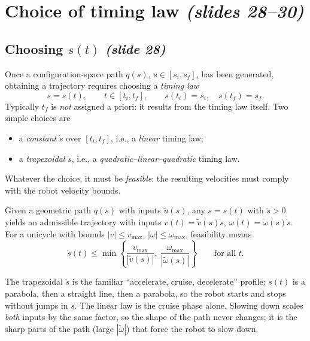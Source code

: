 \documentclass[11pt,a4paper]{article}
\def\boldsymbol#1{#1}%
\newcommand{\q}{\boldsymbol{q}}
\newcommand{\ut}{\tilde{\boldsymbol{u}}}
\newcommand{\vt}{\tilde v}
\newcommand{\wt}{\tilde\omega}
\theoremstyle{definition}
\theoremstyle{plain}
\theoremstyle{remark}
\begin{document}
\section{Choice of timing law \emph{(slides 28--30)}}
 
\subsection{Choosing $s(t)$ \emph{(slide 28)}}
 
Once a configuration-space path $\q(s)$, $s\in[s_i,s_f]$, has been generated, obtaining a trajectory requires choosing a
\emph{timing law}
\begin{equation}
s=s(t),\qquad t\in[t_i,t_f],\qquad s(t_i)=s_i,\quad s(t_f)=s_f .
\end{equation}
Typically $t_f$ is \emph{not} assigned a priori: it results from the timing law itself. Two simple choices are
\begin{itemize}[nosep]
\item a \emph{constant} $\dot s$ over $[t_i,t_f]$, i.e., a \emph{linear} timing law;
\item a \emph{trapezoidal} $\dot s$, i.e., a \emph{quadratic--linear--quadratic} timing law.
\end{itemize}
Whatever the choice, it must be \emph{feasible}: the resulting velocities must comply with the robot velocity bounds.
 
Given a geometric path $\q(s)$ with inputs $\ut(s)$, any $s=s(t)$ with $\dot s>0$ yields an admissible trajectory with inputs
$v(t)=\vt(s)\dot s$, $\omega(t)=\wt(s)\dot s$. For a unicycle with bounds $|v|\le v_{\max}$, $|\omega|\le\omega_{\max}$, feasibility means
\[
\dot s(t)\le\min\left\{\frac{v_{\max}}{|\vt(s)|},\ \frac{\omega_{\max}}{|\wt(s)|}\right\}\qquad\text{for all } t .
\]
 
\begin{intuition}
The trapezoidal $\dot s$ is the familiar ``accelerate, cruise, decelerate'' profile: $s(t)$ is a parabola, then a straight line, then a
parabola, so the robot starts and stops without jumps in $\dot s$. The linear law is the cruise phase alone. Slowing down scales
\emph{both} inputs by the same factor, so the shape of the path never changes; it is the sharp parts of the path (large $|\wt|$) that
force the robot to slow down.
\end{intuition}
 
\end{document}
